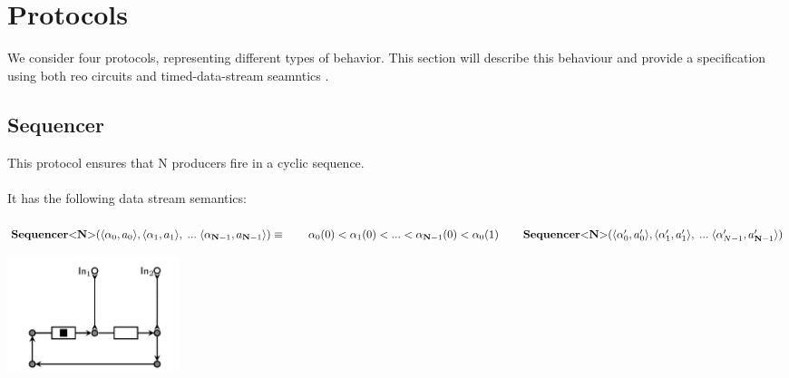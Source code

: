 \section{Protocols}
We consider four protocols, representing different types of behavior. This section will describe this behaviour and provide a specification using both reo circuits \cite{puff} and timed-data-stream seamntics \cite{datastream}.

\subsection{Sequencer}%
\begin{minipage}{.65\textwidth}
  This protocol ensures that N producers fire in a cyclic sequence.\\\\
  It has the following data stream semantics:\\\\
  $
  \vspace{0.2cm}\sequencer (\langle \alpha_0, a_0 \rangle, \langle \alpha_1, a_1 \rangle,\;...\; \langle \alpha_{\textbf{N}-1}, a_{\textbf{N}-1} \rangle) \equiv \\
  \vspace{0.2cm}\hphantom \qquad  \alpha_0(0) < \alpha_1(0) < ... < \alpha_{\textbf{N}-1}(0) < \alpha_0(1) \\
  \hphantom \qquad \sequencer(\langle \alpha_0', a_0' \rangle, \langle \alpha_1', a_1' \rangle,\;...\; \langle \alpha_{N-1}', a_{\textbf{N}-1}' \rangle)
  $
\end{minipage}\hfill
\begin{minipage}{.25\textwidth}
  \includegraphics[width=5cm]{img/seq.png}
\end{minipage}

